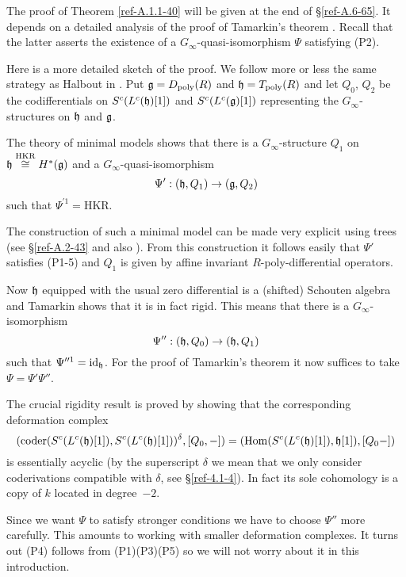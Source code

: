 \documentclass{amsart}
\numberwithin{equation}{section}
\theoremstyle{definition}
\theoremstyle{remark}
\begin{document}
\medskip

The proof of Theorem \ref{ref-A.1.1-40} will be given at the end of
\S\ref{ref-A.6-65}. It depends on a detailed analysis of the proof of
Tamarkin's theorem \cite{Tamarkin}. Recall that the latter asserts the
existence of a $G_\infty$-quasi-isomorphism $\Psi$ satisfying (P2).

\medskip

Here is a more detailed sketch of the proof. We follow  more
or less the same strategy as Halbout in \cite{halb}. Put
$\frak{g}=D_{\operatorname{poly}}(R)$ and $\frak{h}=T_{\operatorname{poly}}(R)$ and let $Q_0$, $Q_2$
be the codifferentials on $S^c(L^c(\frak{h})[1])$ and
$S^c(L^c(\frak{g})[1])$ representing the $G_\infty$-structures on
$\frak{h}$ and $\frak{g}$.

The theory of minimal models shows that there is a
$G_\infty$-structure $Q_1$ on $\frak{h}\overset{\text{HKR}}{\cong}H^\ast(\frak{g})$ and a
$G_\infty$-quasi-isomorphism
\[
\Psi':(\frak{h},Q_1)\rightarrow (\frak{g},Q_2)
\]
such that $\Psi^{\prime 1}=\text{HKR}$. 

The construction of such a minimal model can be made very explicit
using trees (see \S\ref{ref-A.2-43} and also
\cite{CL,KS2,Merkulov}). From this construction it follows easily
that $\Psi'$ satisfies (P1-5) and $Q_1$ is given by affine invariant
$R$-poly-differential operators.

Now $\frak{h}$ equipped with the usual zero differential is a
(shifted) Schouten algebra and Tamarkin shows that it is in fact
rigid. This means that there is a $G_\infty$-isomorphism
\[
\Psi'':(\frak{h},Q_0)\rightarrow (\frak{h},Q_1) 
\]
such that $\Psi^{\prime\prime 1}={\operatorname{id}}_{\frak{h}}$.  For the proof of
Tamarkin's theorem it now suffices to take $\Psi=\Psi'\Psi''$.

\medskip

The crucial rigidity result is proved by showing that the
corresponding deformation complex
\[
({\operatorname{coder}} (S^c(L^c(\frak{h})[1]),S^c(L^c(\frak{h})[1]))^\delta,[Q_0,-])=
({\operatorname {Hom}}(S^c(L^c(\frak{h})[1]),\frak{h}[1]),[Q_0-])
\]
is essentially acyclic (by the superscript $\delta$ we mean that we
only consider coderivations compatible with $\delta$, see \S\ref{ref-4.1-4}). In fact its
sole cohomology is a copy of $k$ located in degree~$-2$.

\medskip

Since we want $\Psi$ to satisfy stronger conditions we have
to choose $\Psi''$ more carefully. This amounts to working with smaller
deformation complexes. It turns out (P4) follows from (P1)(P3)(P5) so we will
not worry about it in this introduction. 
\end{document}
